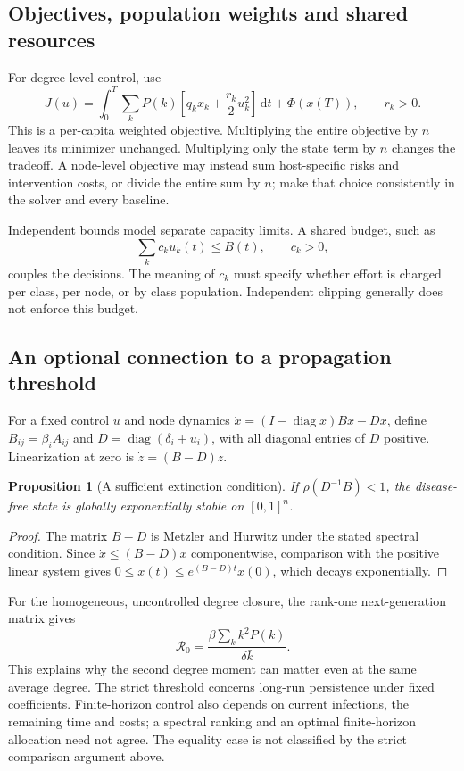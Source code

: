 \documentclass[11pt,a4paper]{article}
\newcommand{\dd}{\,\mathrm{d}}
\DeclareMathOperator{\diag}{diag}
\newtheorem{proposition}{Proposition}[section]
\theoremstyle{definition}
\theoremstyle{remark}
\begin{document}
\subsection{Objectives, population weights and shared resources}
For degree-level control, use
\begin{equation}
J(u)=\int_0^T\sum_k P(k)\left[q_kx_k+\frac{r_k}{2}u_k^2\right]\dd t
+\Phi(x(T)),\qquad r_k>0.
\label{eq:degree-objective}
\end{equation}
This is a per-capita weighted objective. Multiplying the entire objective by $n$ leaves its minimizer unchanged. Multiplying only the state term by $n$ changes the tradeoff. A node-level objective may instead sum host-specific risks and intervention costs, or divide the entire sum by $n$; make that choice consistently in the solver and every baseline.

Independent bounds model separate capacity limits. A shared budget, such as
\begin{equation}
\sum_k c_k u_k(t)\le B(t),\qquad c_k>0,
\end{equation}
couples the decisions. The meaning of $c_k$ must specify whether effort is charged per class, per node, or by class population. Independent clipping generally does not enforce this budget.

\subsection{An optional connection to a propagation threshold}
For a fixed control $u$ and node dynamics $\dot x=(I-\diag x)Bx-Dx$, define
$B_{ij}=\beta_i A_{ij}$ and $D=\diag(\delta_i+u_i)$, with all diagonal entries of $D$ positive. Linearization at zero is $\dot z=(B-D)z$.
\begin{proposition}[A sufficient extinction condition]
If $\rho(D^{-1}B)<1$, the disease-free state is globally exponentially stable on $[0,1]^n$.
\end{proposition}
\begin{proof}
The matrix $B-D$ is Metzler and Hurwitz under the stated spectral condition. Since $\dot x\le(B-D)x$ componentwise, comparison with the positive linear system gives $0\le x(t)\le e^{(B-D)t}x(0)$, which decays exponentially.
\end{proof}
For the homogeneous, uncontrolled degree closure, the rank-one next-generation matrix gives
\begin{equation}
\mathcal R_0=\frac{\beta\sum_k k^2P(k)}{\delta\bar k}.
\end{equation}
This explains why the second degree moment can matter even at the same average degree. The strict threshold concerns long-run persistence under fixed coefficients. Finite-horizon control also depends on current infections, the remaining time and costs; a spectral ranking and an optimal finite-horizon allocation need not agree. The equality case is not classified by the strict comparison argument above.
\end{document}
